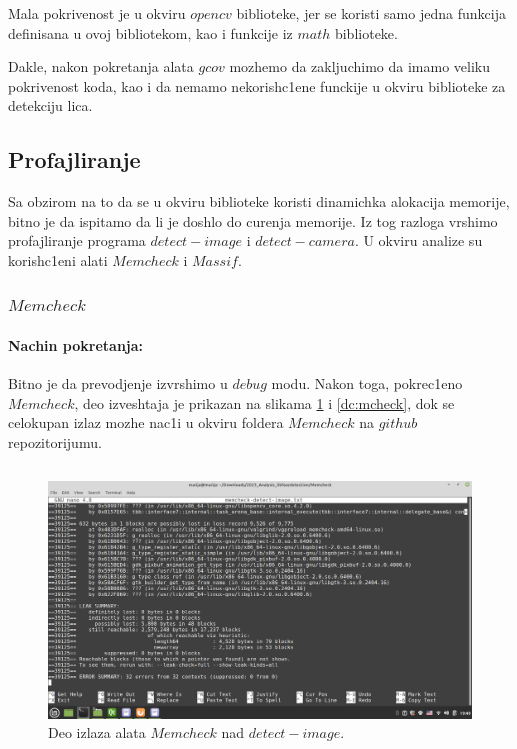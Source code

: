 \documentclass{article}
\begin{document}
Mala pokrivenost je u okviru $opencv$ biblioteke, jer se koristi samo jedna funkcija definisana u ovoj bibliotekom, kao i funkcije iz $math$ biblioteke. 

Dakle, nakon pokretanja alata $gcov$ mozhemo da zakljuchimo da imamo veliku pokrivenost koda, kao i da nemamo nekorish\-c1ene funckije u okviru biblioteke za detekciju lica.

\subsection{Profajliranje}
Sa obzirom na to da se u okviru biblioteke koristi dinamichka alokacija memorije, bitno je da ispitamo da li je doshlo do curenja memorije. Iz tog razloga vrshimo profajliranje programa $detect-image$ i $detect-camera$. U okviru analize su korish\-c1eni alati $Memcheck$ i $Massif$.
\subsubsection{$Memcheck$}

\paragraph{Nachin pokretanja:} 
Bitno je da prevodjenje izvrshimo u $debug$ modu. Nakon toga, pokrec1eno $Memcheck$, deo izveshtaja je prikazan na slikama \ref{di:mcheck} i \ref{dc:mcheck}, dok se celokupan izlaz mozhe nac1i u okviru foldera $Memcheck$ na $github$ repozitorijumu. 
\selectfont
\inputminted[]{shell-session}{run_memcheck.sh}

\selectfont
\begin{figure}[H]
    \centering
    \includegraphics[width=12cm]{img/memcheck/memcheck-detect-image.png}
    \caption{Deo izlaza alata $Memcheck$ nad $detect-image.$}
    \label{di:mcheck}
\end{figure}
\end{document}
